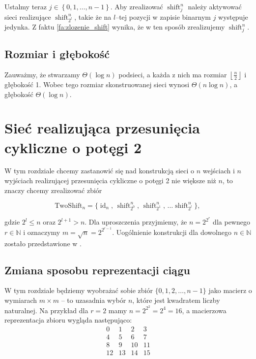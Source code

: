\documentclass[a4paper]{article}
\newcommand{\todo}[1]{\begin{center} \fbox{TODO: #1} \end{center}}
\newcommand{\shift}[2]{\operatorname{shift}_{#2}^{#1}}
\newcommand{\id}[1]{\operatorname{id}_{#1}}
\newcommand{\tc}{\text{, }}
\newcommand{\floor}[1]{\left\lfloor #1 \right\rfloor}
\newcommand{\twoshift}[1]{\text{TwoShift}_{#1}}
\newcommand{\N}{\mathbb{N}}
\newcommand{\lt}{\left}
\newcommand{\rt}{\right}
\theoremstyle{definition}
\begin{document}
\vspace{.5em}

Ustalmy teraz \(j \in \lt\{ 0, 1, \ldots, n-1 \rt\}\). Aby zrealizować \(\shift n j\) należy aktywować sieci realizujące \(\shift n {2^l}\), takie że na \(l\)--tej pozycji w zapisie binarnym \(j\) występuje jedynka. Z  faktu \ref{fa:zlozenie_shift} wynika, że w ten sposób zrealizujemy \(\shift n j\). 

\subsection{Rozmiar i głębokość}

Zauważmy, że stwarzamy \(\Theta(\log n)\) podsieci, a każda z nich ma rozmiar  \(\floor{\frac n 2}\) i głębokość 1. Wobec tego rozmiar skonstruowanej sieci wynosi \(\Theta(n \log n)\), a głębokość \(\Theta(\log n)\).

\todo{Zrobić rysunek tej sieci}


\section{Sieć realizująca przesunięcia cykliczne o potęgi 2}

W tym rozdziale chcemy zastanowić się nad konstrukcją sieci o \(n\) wejściach i \(n\) wyjściach realizującej przesunięcia cykliczne o potęgi 2 nie większe niż \(n\), to znaczy chcemy zrealizować zbiór

\[
\twoshift{n} = \{ \id n \tc \shift n {2^0} \tc \shift n {2^1} \tc \ldots \shift n {2^l}\} \tc
\]

gdzie \(2^l \leq n\) oraz \(2^{l+1} > n\). Dla uproszczenia przyjmiemy, że \(n = 2^{2^r}\) dla pewnego \(r \in \N\) i oznaczymy \( m = \sqrt{n} = 2^{2^{r-1}} \). Uogólnienie konstrukcji dla dowolnego \(n \in \N\) zostało przedstawione w \cite{klo}.


\subsection{Zmiana sposobu reprezentacji ciągu}

W tym rozdziale będziemy wyobrażać sobie zbiór \(\{0, 1, 2, \ldots, n-1\}\) jako macierz o wymiarach \(m \times m\) -- to uzasadnia wybór \(n\), które jest kwadratem liczby naturalnej. Na przykład dla \(r = 2\) mamy \(n = 2^{2^2} = 2^4 = 16\), a macierzowa reprezentacja zbioru wygląda następująco:
\[
\begin{matrix}
 0 &  1 &  2 &  3 \\
 4 &  5 &  6 &  7 \\
 8 &  9 & 10 & 11 \\
12 & 13 & 14 & 15
\end{matrix}
\]
\end{document}
